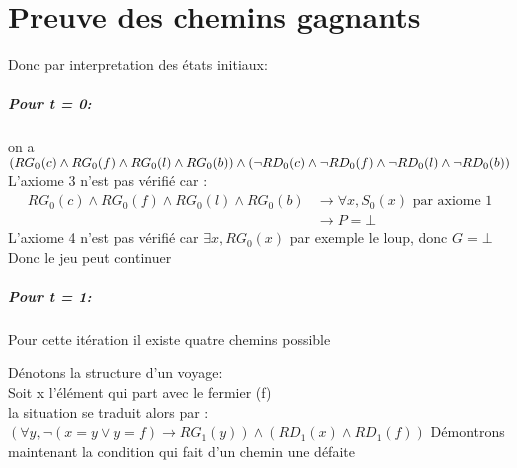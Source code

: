 \documentclass{article}
\begin{document}
\begin{center}
\end{center}


\section*{Preuve des chemins gagnants}

Donc par interpretation des états initiaux:

\subparagraph*{Pour t = 0:}
on a $(RG_0(c) \wedge RG_0(f) \wedge RG_0(l) \wedge RG_0(b)) \wedge (\neg RD_0(c) \wedge \neg RD_0(f) \wedge \neg RD_0(l) \wedge \neg RD_0(b))\\ $
L'axiome 3 n'est pas vérifié car :\\
\begin{align*}
  RG_0(c) \wedge RG_0(f) \wedge RG_0(l) \wedge RG_0(b) & \rightarrow \forall x, S_0(x) \text{ par axiome 1} \\
                                                       & \rightarrow P = \bot
\end{align*}
L'axiome 4 n'est pas vérifié car $\exists x , RG_0(x)$ par exemple le loup, donc $G = \bot$ \\
Donc le jeu peut continuer

\subparagraph*{Pour t = 1:}

Pour cette itération il existe quatre chemins possible

Dénotons la structure d'un voyage:\\
Soit x l'élément qui part avec le fermier (f)\\
la situation se traduit alors par :\\
$(\forall y , \neg(x = y \vee y = f) \rightarrow RG_1(y)) \wedge (RD_1(x) \wedge RD_1(f))$
Démontrons maintenant la condition qui fait d'un chemin une défaite
\end{document}
